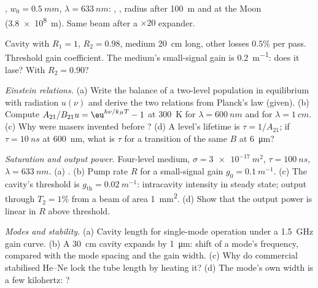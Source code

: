 \begin{exercise}[$\star$]\label{exo:b2:laser:3}
, $w_0 = \qty{0.5}{mm}$, $\lambda = \qty{633}{nm}$: , , radius after \qty{100}{m} and at the Moon
(\qty{3.8e8}{m}). Same beam after a $\times 20$ expander.
\end{exercise}

\begin{exercise}[$\star$]\label{exo:b2:laser:4}
Cavity with $R_1 = 1$, $R_2 = 0.98$, medium \qty{20}{cm} long, other
losses $0.5\%$ per pass. Threshold gain coefficient. The medium's
small-signal gain is \qty{0.2}{m^{-1}}: does it lase? With
$R_2 = 0.90$?
\end{exercise}

\begin{exercise}[$\star\star$]\label{exo:b2:laser:5}
\emph{Einstein relations.} (a) Write the balance of a two-level
population in equilibrium with radiation $u(\nu)$ and derive the two
relations from Planck's law (given). (b) Compute
$A_{21}/B_{21}u = \eu^{h\nu/k_BT} - 1$ at \qty{300}{K} for
$\lambda = \qty{600}{nm}$ and for $\lambda = \qty{1}{cm}$. (c) Why were
masers invented before ? (d) A level's lifetime is
$\tau = 1/A_{21}$; if $\tau = \qty{10}{ns}$ at \qty{600}{nm}, what is
$\tau$ for a transition of the same $B$ at \qty{6}{\micro m}?
\end{exercise}

\begin{exercise}[$\star\star$]\label{exo:b2:laser:6}
\emph{Saturation and output power.} Four-level medium, $\sigma =
\qty{3e-17}{m^2}$, $\tau = \qty{100}{ns}$, $\lambda = \qty{633}{nm}$.
(a) . (b) Pump rate $R$ for a small-signal gain
$g_0 = \qty{0.1}{m^{-1}}$. (c) The cavity's threshold is
$g_{\text{th}} = \qty{0.02}{m^{-1}}$: intracavity intensity in steady
state; output through $T_2 = 1\%$ from a beam of area \qty{1}{mm^2}.
(d) Show that the output power is linear in $R$ above threshold.
\end{exercise}

\begin{exercise}[$\star\star$]\label{exo:b2:laser:7}
\emph{Modes and stability.} (a) Cavity length for single-mode operation
under a \qty{1.5}{GHz} gain curve. (b) A \qty{30}{cm} cavity expands
by \qty{1}{\micro m}: shift of a mode's frequency, compared with the
mode spacing and the gain width. (c) Why do commercial stabilised He--Ne
 lock the tube length by heating it? (d) The mode's own width is
a few kilohertz: ?
\end{exercise}

